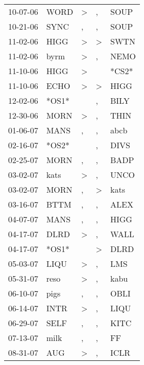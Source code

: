\begin{supertabular}{lllll}
 10-07-06 &   WORD &     \textgreater &                , &   SOUP \\
 10-21-06 &   SYNC &                , &                , &   SOUP \\
 11-02-06 &   HIGG &     \textgreater &     \textgreater &   SWTN \\
 11-02-06 &   byrm &     \textgreater &                , &   NEMO \\
 11-10-06 &   HIGG &     \textgreater &                  &  *CS2* \\
 11-10-06 &   ECHO &     \textgreater &     \textgreater &   HIGG \\
 12-02-06 &  *OS1* &                  &                , &   BILY \\
 12-30-06 &   MORN &     \textgreater &                , &   THIN \\
 01-06-07 &   MANS &                , &                , &   abcb \\
 02-16-07 &  *OS2* &                  &                , &   DIVS \\
 02-25-07 &   MORN &                , &                , &   BADP \\
 03-02-07 &   kats &     \textgreater &                , &   UNCO \\
 03-02-07 &   MORN &                , &     \textgreater &   kats \\
 03-16-07 &   BTTM &                , &                , &   ALEX \\
 04-07-07 &   MANS &                , &                , &   HIGG \\
 04-17-07 &   DLRD &     \textgreater &                , &   WALL \\
 04-17-07 &  *OS1* &                  &     \textgreater &   DLRD \\
 05-03-07 &   LIQU &     \textgreater &                , &    LMS \\
 05-31-07 &   reso &     \textgreater &                , &   kabu \\
 06-10-07 &   pigs &                , &                , &   OBLI \\
 06-14-07 &   INTR &     \textgreater &                , &   LIQU \\
 06-29-07 &   SELF &                , &                , &   KITC \\
 07-13-07 &   milk &                , &                , &     FF \\
 08-31-07 &    AUG &     \textgreater &                , &   ICLR \\

\end{supertabular}
